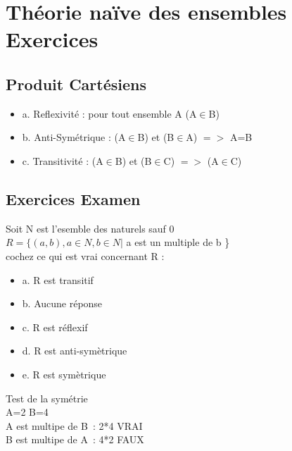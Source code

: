 \newpage

\section{Théorie naïve des ensembles Exercices}
\vspace{5mm} %

\subsection{Produit Cartésiens}
\vspace{3mm} %

\begin{itemize}
\item {a. Reflexivité : pour tout ensemble A (A$\in$B)}
\item {b. Anti-Symétrique : (A$\in$B) et (B$\in$A) $=>$ A=B}
\item {c. Transitivité : (A$\in$B) et (B$\in$C) $=>$ (A$\in$C)}
\end{itemize}

\subsection{Exercices Examen}
\vspace{3mm} %

Soit N est l’esemble des naturels sauf 0 \\
$R=\{(a,b), a ∈ N, b ∈ N | $ a est un multiple de b \} \\

\vspace{3mm} %
cochez ce qui est vrai concernant R : \\

\begin{itemize}[label=$\square$]
\item {a. R est transitif}
\item {b. Aucune réponse}
\item {c. R est réflexif}
\item {d. R est anti-symètrique}
\item {e. R est symètrique}
\end{itemize}

\vspace{5mm} %

Test de la symétrie \\

A=2 B=4 \\
A est multipe de B : 2*4 VRAI \\
B est multipe de A : 4*2 FAUX \\


